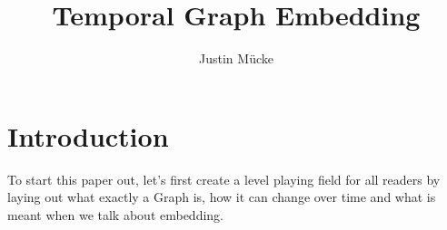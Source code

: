 \documentclass[sigconf]{acmart}
\begin{document}
\title{Temporal Graph Embedding}

\author{Justin Mücke}



\renewcommand{\shortauthors}{Justin Mücke}

\begin{abstract}
  
\end{abstract}





\maketitle

\section{Introduction}

To start this paper out, let's first create a level playing field for all readers by laying out what exactly a Graph is, 
how it can change over time and what is meant when we talk about embedding.
\end{document}

